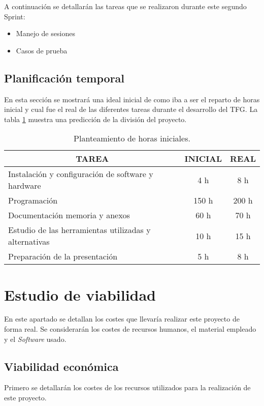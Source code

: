 A continuación se detallarán las tareas que se realizaron durante este segundo Sprint:
\begin{itemize}
	\item Manejo de sesiones
	\item Casos de prueba
\end{itemize}	

\subsection{Planificación temporal}

En esta sección se mostrará una ideal inicial de como iba a ser el reparto de horas inicial y cual fue el real de las diferentes tareas durante el desarrollo del TFG. La tabla \ref{horas} muestra una predicción de la división del proyecto.

\begin{table}[]
	\label{horas}
	\centering
	\begin{tabular}{|l|c|c|}
		\hline
		\multicolumn{1}{|c|}{\textbf{TAREA}}     & \textbf{INICIAL} & \textbf{REAL} \\ \hline
		Instalación y configuración de software y hardware & 4 h & 8 h  \\ \hline
		Programación                            & 150 h  & 200 h       \\ \hline
		Documentación memoria y anexos          & 60 h   & 70 h     \\ \hline
		Estudio de las herramientas utilizadas y alternativas & 10 h & 15 h \\ \hline
		Preparación de la presentación		    & 5 h   & 8 h        \\ \hline
	\end{tabular}
	\caption{Planteamiento de horas iniciales.}
\end{table}


\section{Estudio de viabilidad}
En este apartado se detallan los costes que llevaría realizar este proyecto de forma real. Se considerarán los costes de recursos humanos, el material empleado y el \emph{Software} usado. 

\subsection{Viabilidad económica}
Primero se detallarán los costes de los recursos utilizados para la realización de este proyecto.

